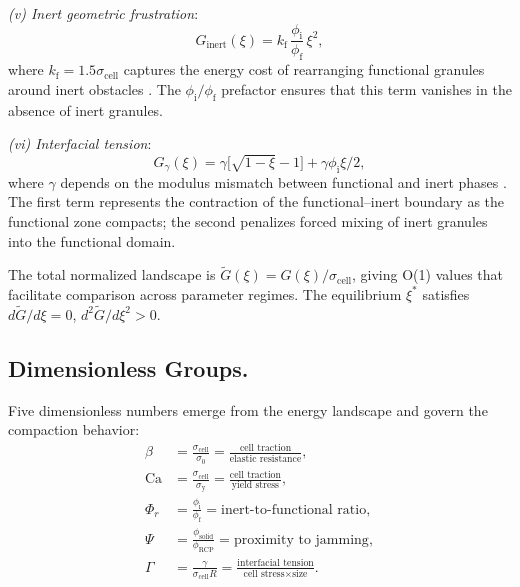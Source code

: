 \documentclass[9pt,twocolumn,twoside]{pnas-new}
\newcommand{\phif}{\phi_\mathrm{f}}
\newcommand{\phii}{\phi_\mathrm{i}}
\newcommand{\phiRCP}{\phi_\mathrm{RCP}}
\newcommand{\xistar}{\xi^{*}}
\newcommand{\Gtilde}{\tilde{G}}
\newcommand{\sigmacell}{\sigma_\mathrm{cell}}
\newcommand{\sigmazero}{\sigma_0}
\newcommand{\sigmay}{\sigma_\mathrm{y}}
\begin{document}
\textit{(v) Inert geometric frustration}:
\begin{equation}\label{eq:Ginert}
  G_\mathrm{inert}(\xi) = k_\mathrm{f}\,
  \frac{\phii}{\phif}\,\xi^2,
\end{equation}
where $k_\mathrm{f} = 1.5\sigmacell$ captures the energy cost of
rearranging functional granules around inert obstacles \cite{Bi2014,Bi2015}.
The $\phii/\phif$ prefactor ensures that this term vanishes in the absence
of inert granules.

\textit{(vi) Interfacial tension}:
\begin{equation}\label{eq:Gsurface}
  G_\gamma(\xi) = \gamma\bigl[\sqrt{1 - \xi} - 1\bigr]
  + \gamma \phii \xi / 2,
\end{equation}
where $\gamma$ depends on the modulus mismatch between functional and inert
phases \cite{Princen1979,Princen1983}. The first term represents the
contraction of the functional--inert boundary as the functional zone
compacts; the second penalizes forced mixing of inert granules into the
functional domain.

The total normalized landscape is
$\Gtilde(\xi) = G(\xi) / \sigmacell$, giving O(1) values that facilitate
comparison across parameter regimes. The equilibrium $\xistar$ satisfies
$d\Gtilde/d\xi = 0$, $d^2\Gtilde/d\xi^2 > 0$.

\subsection*{Dimensionless Groups.}

Five dimensionless numbers emerge from the energy landscape and govern the
compaction behavior:
%
\begin{align}
  \beta &= \frac{\sigmacell}{\sigmazero}
  = \frac{\text{cell traction}}{\text{elastic resistance}}, \label{eq:beta} \\[4pt]
  \mathrm{Ca} &= \frac{\sigmacell}{\sigmay}
  = \frac{\text{cell traction}}{\text{yield stress}}, \label{eq:Ca} \\[4pt]
  \Phi_r &= \frac{\phii}{\phif}
  = \text{inert-to-functional ratio}, \label{eq:Phir} \\[4pt]
  \Psi &= \frac{\phi_\mathrm{solid}}{\phiRCP}
  = \text{proximity to jamming}, \label{eq:Psi} \\[4pt]
  \Gamma &= \frac{\gamma}{\sigmacell R}
  = \frac{\text{interfacial tension}}{\text{cell stress} \times \text{size}}.
  \label{eq:Gamma}
\end{align}
\end{document}
